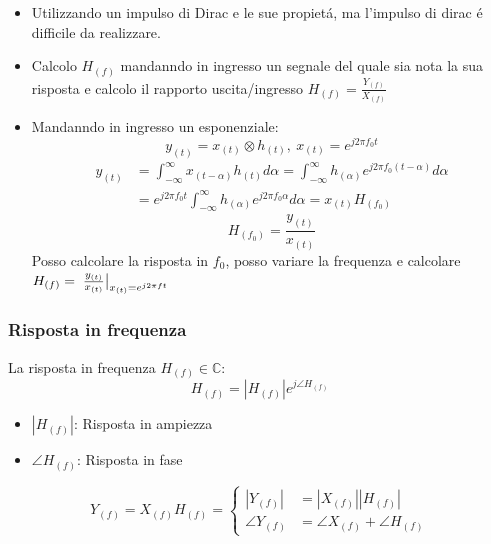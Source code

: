         \begin{itemize}
            \item {
                Utilizzando un impulso di Dirac e le sue propietá, ma l'impulso di dirac é difficile da realizzare. 
            }
            \item {
                Calcolo $H_{(f)}$ mandanndo in ingresso un segnale del quale sia nota la sua risposta e calcolo il rapporto uscita/ingresso 
                $H_{(f)} = \frac{Y_{(f)}}{X_{(f)}}$
            }
            \item {
                Mandanndo in ingresso un esponenziale:
                \[
                    y_{(t)} = x_{(t)}\otimes h_{(t)},\ x_{(t)} = e^{j2\pi f_0t}
                \]
                \begin{align}
                    y_{(t)} &= \int_{-\infty}^{\infty}x_{(t-\alpha)}h_{(t)}d\alpha = \int_{-\infty}^{\infty}h_{(\alpha)} e^{j2\pi f_0(t-\alpha)}d\alpha \nonumber \\
                            &= e^{j2\pi f_0t}\int_{-\infty}^{\infty}h_{(\alpha)} e^{j2\pi f_0\alpha}d\alpha = x_{(t)}H_{(f_0)} \nonumber 
                \end{align}
                \[
                    H_{(f_0)} = \frac{y_{(t)}}{x_{(t)}}
                \]  
                Posso calcolare la risposta in $f_0$, posso variare la frequenza e calcolare $H_{(f)} = \eval*{\frac{y_{(t)}}{x_{(t)}}}_{x_{(t)} = e^{j2\pi ft}}$
            }
        \end{itemize}
        \subsubsection{Risposta in frequenza}
            La risposta in frequenza $H_{(f)} \in \mathbb{C}$:
            \[
                H_{(f)} = |H_{(f)}| e^{j\angle H_{(f)} }
            \]  
            \begin{itemize}
                \item$|H_{(f)}|$: Risposta in ampiezza
                \item $\angle H_{(f)}$: Risposta in fase 
            \end{itemize}
            \[
                Y_{(f)} = X_{(f)} H_{(f)} = 
                \begin{cases}
                    |Y_{(f)}| &= |X_{(f)}||H_{(f)}| \nonumber \\
                    \angle Y_{(f)} &= \angle X_{(f)} + \angle H_{(f)} \nonumber
                \end{cases} 
            \]  
